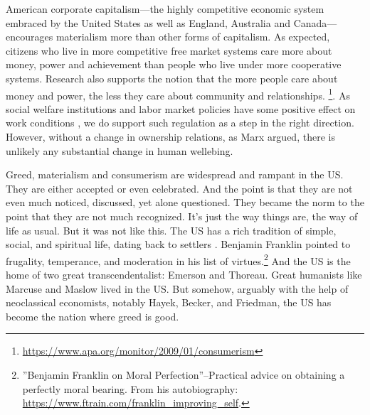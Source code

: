\documentclass[10pt, letterpaper]{article}
\begin{document}
\begin{spacing}{1.8}
American corporate capitalism---the highly competitive economic system embraced by the United States as well as England, Australia and Canada---encourages
materialism more than other forms of capitalism.
%
As expected, citizens who live in more competitive free market systems care more about money, power and achievement than people who live under more cooperative systems. Research also supports the notion that the more people care about money and power, the less they care about community and relationships.
\footnote{\url{https://www.apa.org/monitor/2009/01/consumerism}}.
 As social welfare institutions and labor market policies have some positive
 effect on work conditions \citep{inanc20}, we do support such regulation as a step in the
 right direction. However, without a change in ownership relations,
 as Marx argued, there is unlikely any substantial change in human wellebing. %


Greed, materialism and consumerism are widespread and rampant in the US. They
are either accepted or even celebrated. And the point is that they are not even
much noticed, discussed, yet alone questioned. They became the norm to the point
that they are not much recognized. It's just the way things are, the way of life
as usual. But it was not like this. The  US has a rich tradition of simple,
social, and spiritual life, dating back to settlers \cite{fischer91}. Benjamin
Franklin pointed to frugality, temperance, and moderation in his list of
virtues.\footnote{''Benjamin Franklin on Moral Perfection''--Practical advice on
  obtaining a perfectly moral bearing. From his autobiography:
  \url{https://www.ftrain.com/franklin_improving_self}.} And the
US is the home of two great transcendentalist: Emerson and Thoreau. Great humanists like Marcuse and Maslow lived in the
US. But somehow, arguably with the help of neoclassical economists, notably
Hayek, Becker, and Friedman, the US has become the nation where greed is good.


\end{spacing}
\end{document}
